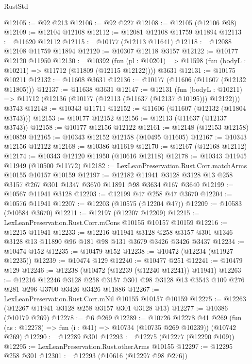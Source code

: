 \begin{lexlean}{RustStd}
\begin{coremodule}
@12105 := @92 @213
@12106 := @92 @227
@12108 := @12105 (@12106 @98)
@12109 := @12104 @12108
@12112 := @12081 @12108 @11759 @11894
@12113 := @11620 @12112
@12115 := @10177 (@12113 @11641)
@12118 := @12088 @12108 @11759 @11894
@12120 := @10307 @12118 @3157
@12122 := @10177 @12120 @11950
@12130 := @10392
    (fun (pl : @10201) => @11598 (fun (bodyL : @10211) => @11712 (@11809 (@12115 @12122))))
    @3631
@12131 := @10175 @10211
@12132 := @11608 @3631
@12136 := @10177 (@11606 (@11607 (@12132 @11805)))
@12137 := @11638 @3631
@12147 := @12131
    (fun (bodyL : @10211) => @11712 (@12136 (@10177 (@12113 (@11637 (@12137 @10195))) @12122)))
    @3743
@12148 := @10343 @11711
@12152 := @11606 (@11607 (@12132 (@11804 @3743)))
@12153 := @10177 @12152
@12156 := @12113 (@11637 (@12137 @3743))
@12158 := @10177 @12156 @12122
@12161 := @12148 (@12153 @12158) @10859
@12165 := @10343 @12152 @12158 (@10495 @11605)
@12167 := @10343 @12156 @12122
@12168 := @10386 @11619
@12170 := @12167 (@12168 @12112)
@12174 := @10343 @12120 @11950 (@10616 @12118)
@12178 := @10343 @11945 @11949 (@10500 @11772)
@12182 := LexLeanPreservation.Rust.Corr.matchArms @10155 @10157 @10159
@12197 := @12182 @11941 @3128 @3128 @13 @258 @3157 @267 @301 @1347 @3670 @11891 @98 @3634 @167 @3640
@12199 := @10567 @11941 @3128
@12203 := @12199 @47 @258 @47 @3670
@12204 := @10576 @11941
@12207 := @12203 (@10575 (@12204 @47))
@12209 := @10583 (@10584 @3670)
@12211 := @12197 (@12207 @12209)
@12215 := LexLeanPreservation.Rust.Corr.mCons @10155 @10157 @10159
@12216 := @12215 @11941
@12233 := @12216
    @11941
    @3128
    @258
    @3157
    @301
    @1346
    @3128
    @13
    @11890
    @96
    @181
    @98
    @131
    @3679
    @3426
    @3426
    @3437
@12234 := @10474 @152
@12235 := @10479 @152
@12238 := @10472 (@12234 (@11927 @12235))
@12239 := @10474 @129
@12240 := @10477 @251
@12241 := @10479 @129
@12246 := @12238 (@10472 (@12239 (@12240 @12241)) @11941)
@12263 := @12216
    @12246
    @3128
    @258
    @3157
    @301
    @98
    @3128
    @13
    @3543
    @109
    @276
    @281
    @296
    @3700
    @3426
    @3426
    @11886
@12267 := LexLeanPreservation.Rust.Corr.mNil @10155 @10157 @10159
@12275 := @12263 (@12267 @11941 @3128 @258 @3157 @301 @3128 @13)
@12277 := @10386 (@10179 @269)
@12278 := @6 @269
@12289 := @10726
    @12278
    @41
    @269
    (fun (as : @12278) => fun (i : @41) => @10734 (@10735 @269 @10239))
    (@10742 @269)
@12290 := @12289 @301
@12293 := @12275 (@12277 (@12290 @109))
@12295 := LexLeanPreservation.Rust.otherArms @10155
@12297 := @12295 @258 @301
@12301 := @12293 (@10616 (@12297 @98 @276))

\end{coremodule}
\end{lexlean}

